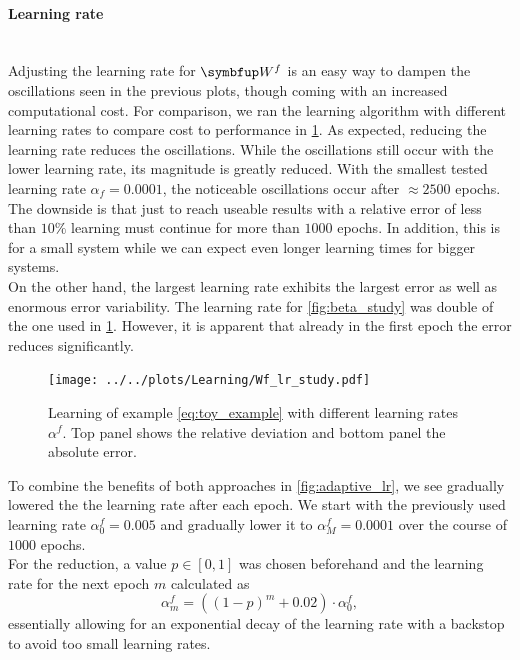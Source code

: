 \paragraph{Learning rate}\mbox{}\\
Adjusting the learning rate for $\bmu{W}^f$ is an easy way to dampen the oscillations seen in the previous plots, though coming with an increased computational cost. For comparison, we ran the learning algorithm with different learning rates to compare cost to performance in \cref{fig:lr_fast_study}. As expected, reducing the learning rate reduces the oscillations. While the oscillations still occur with the lower learning rate, its magnitude is greatly reduced. With the smallest tested learning rate $\alpha_f = 0.0001$, the noticeable oscillations occur after $\approx 2500$ epochs. The downside is that just to reach useable results with a relative error of less than $10\%$ learning must continue for more than $1000$ epochs. In addition, this is for a small system while we can expect even longer learning times for bigger systems.\\
On the other hand, the largest learning rate exhibits the largest error as well as enormous error variability. The learning rate for \cref{fig:beta_study} was double of the one used in \cref{fig:lr_fast_study}. However, it is apparent that already in the first epoch the error reduces significantly.\\
\begin{figure}
	\centering
	\texttt{[image: ../../plots/Learning/Wf\_lr\_study.pdf]}
	\caption{Learning of example \cref{eq:toy_example} with different learning rates $\alpha^f$. Top panel shows the relative deviation and bottom panel the absolute error.}
	\label{fig:lr_fast_study}
\end{figure}
To combine the benefits of both approaches in \cref{fig:adaptive_lr}, we see gradually lowered the the learning rate after each epoch. We start with the previously used learning rate $\alpha_0^f = 0.005$ and gradually lower it to $\alpha_M^f = 0.0001$ over the course of $1000$ epochs.\\
For the reduction, a value $p\in \left[0,1\right]$ was chosen beforehand and the learning rate for the next epoch $m$ calculated as
\begin{equation}\label{eq:drop}
	\alpha_{m}^f = (\left(1-p\right)^m + 0.02)\cdot\alpha_0^f,
\end{equation}
essentially allowing for an exponential decay of the learning rate with a backstop to avoid too small learning rates.\\
